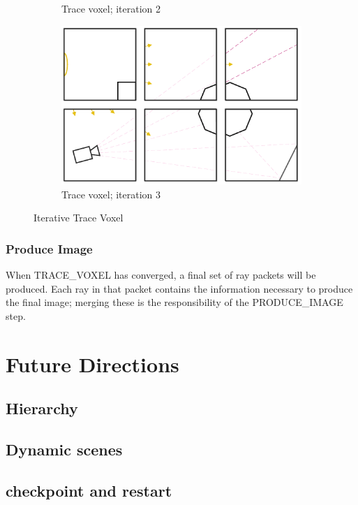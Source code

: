 \documentclass{vgtc}                          %
\begin{document}
\begin{figure}[!htb]
\begin{subfigure}{.49\columnwidth}
  \caption{Trace voxel; iteration 2}
\end{subfigure}
\begin{subfigure}{.49\columnwidth}
 \centering
  \includegraphics[width=.98\columnwidth]{drawings/Trace4.pdf}
  \caption{Trace voxel; iteration 3}
\end{subfigure}
\caption{Iterative Trace Voxel}
\label{fig:trace}
\end{figure}

\subsubsection{Produce Image}
When TRACE\_VOXEL has converged, a final set of ray packets will be
produced. Each ray in that packet contains the information necessary
to produce the final image; merging these is the responsibility of the
PRODUCE\_IMAGE step.

\section{Future Directions}

\subsection{Hierarchy}

\subsection{Dynamic scenes}

\subsection{checkpoint and restart} 
\end{document}
